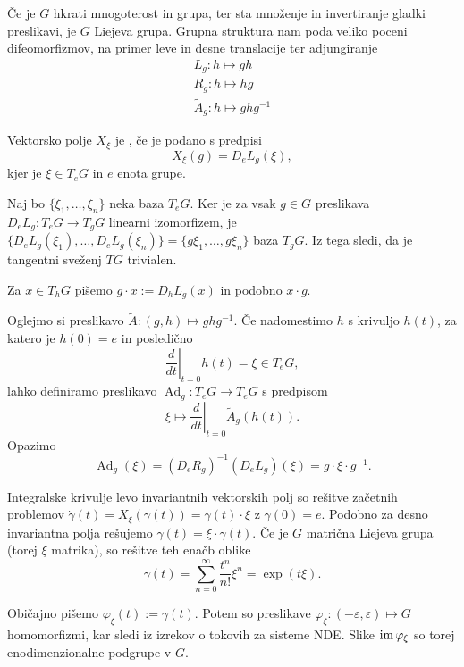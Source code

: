 
Če je $G$ hkrati mnogoterost in grupa, ter sta množenje in invertiranje gladki
preslikavi, je $G$ Liejeva grupa.
Grupna struktura nam poda veliko poceni difeomorfizmov, na primer leve in desne
translacije ter adjungiranje
\begin{gather*}
  L_g: h \mapsto gh \\
  R_g: h \mapsto hg \\
  \tilde{A}_g: h \mapsto ghg^{-1}
\end{gather*}

\begin{definicija}
  Vektorsko polje $X_\xi$ je , če je
  podano s predpisi
  \[
	X_\xi(g) = D_e L_g (\xi),
  \]
  kjer je $\xi \in T_e G$ in $e$ enota grupe.
\end{definicija}

Naj bo $\{\xi_1, \ldots, \xi_n\}$ neka baza $T_e G$.
Ker je za vsak $g \in G$ preslikava $D_e L_g: T_e G \to T_g G$ linearni
izomorfizem, je $\{ D_e L_g(\xi_1), \ldots, D_e L_g(\xi_n) \} = \{ g \xi_1,
\ldots, g \xi_n \}$ baza $T_g G$.
Iz tega sledi, da je tangentni sveženj $T G$ trivialen.

Za $x \in T_h G$ pišemo $g \cdot x := D_h L_g(x)$ in podobno $x \cdot g$.

Oglejmo si preslikavo $\tilde{A}: (g, h) \mapsto ghg^{-1}$.
Če nadomestimo $h$ s krivuljo $h(t)$, za katero je $h(0) = e$ in posledično
\[
  \left. \frac{d}{dt} \right|_{t=0} h(t) = \xi \in T_e G,
\]
lahko definiramo preslikavo $\operatorname{Ad}_g: T_e G \to T_e G$ s predpisom
\[
  \xi \mapsto \left. \frac{d}{dt} \right|_{t=0} \tilde{A}_g(h(t)).
\]
Opazimo
\[
  \operatorname{Ad}_g(\xi) = (D_e R_g)^{-1} (D_e L_g) (\xi)
  = g \cdot \xi \cdot g^{-1}.
\]

Integralske krivulje levo invariantnih vektorskih polj so rešitve začetnih
problemov $\dot{\gamma}(t) = X_\xi (\gamma(t)) = \gamma(t) \cdot \xi$ z
$\gamma(0) = e$.
Podobno za desno invariantna polja rešujemo $\dot{\gamma}(t) = \xi \cdot
\gamma(t)$.
Če je $G$ matrična Liejeva grupa (torej $\xi$ matrika), so rešitve teh enačb
oblike
\[
  \gamma(t) = \sum_{n=0}^\infty \frac{t^n}{n!} \xi^n = \exp(t \xi).
\]

Običajno pišemo $\varphi_\xi(t) := \gamma(t)$.
Potem so preslikave $\varphi_\xi : (-\varepsilon, \varepsilon) \mapsto G$
homomorfizmi, kar sledi iz izrekov o tokovih za sisteme NDE\@.
Slike $\operatorname{im} \varphi_\xi$ so torej enodimenzionalne podgrupe v $G$.

